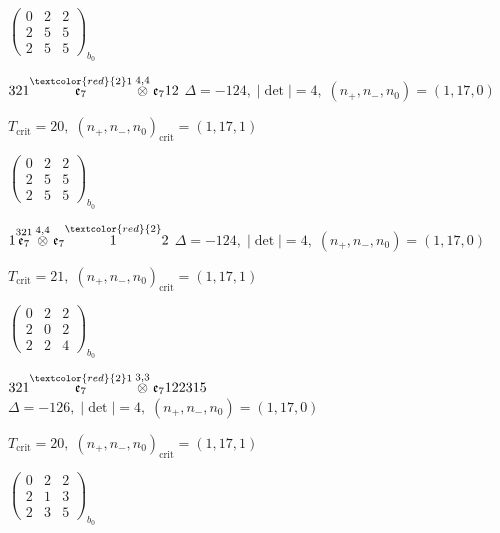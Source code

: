 \documentclass[10pt]{article}
\begin{document}
\hspace{2em}$\left(\begin{smallmatrix}0 & 2 & 2 \\ 2 & 5 & 5 \\ 2 & 5 & 5\end{smallmatrix}\right)_{\!b_0}$

\smallskip

$321\overset{\textcolor{red}{2}1}{\mathfrak{e}_7}\overset{4,4}{\otimes}\mathfrak{e}_712$ \quad $\Delta=-124,\; |\det|=4,\; (n_+,n_-,n_0)=(1,17,0)$

\hspace{1em}$T_{\text{crit}}=20,\; (n_+,n_-,n_0)_{\text{crit}}=(1,17,1)$

\hspace{2em}$\left(\begin{smallmatrix}0 & 2 & 2 \\ 2 & 5 & 5 \\ 2 & 5 & 5\end{smallmatrix}\right)_{\!b_0}$

$1\overset{321}{\mathfrak{e}_7}\overset{4,4}{\otimes}\mathfrak{e}_7\overset{\textcolor{red}{2}}{1}2$ \quad $\Delta=-124,\; |\det|=4,\; (n_+,n_-,n_0)=(1,17,0)$

\hspace{1em}$T_{\text{crit}}=21,\; (n_+,n_-,n_0)_{\text{crit}}=(1,17,1)$

\hspace{2em}$\left(\begin{smallmatrix}0 & 2 & 2 \\ 2 & 0 & 2 \\ 2 & 2 & 4\end{smallmatrix}\right)_{\!b_0}$

\smallskip

$321\overset{\textcolor{red}{2}1}{\mathfrak{e}_7}\overset{3,3}{\otimes}\mathfrak{e}_7122315$ \quad $\Delta=-126,\; |\det|=4,\; (n_+,n_-,n_0)=(1,17,0)$

\hspace{1em}$T_{\text{crit}}=20,\; (n_+,n_-,n_0)_{\text{crit}}=(1,17,1)$

\hspace{2em}$\left(\begin{smallmatrix}0 & 2 & 2 \\ 2 & 1 & 3 \\ 2 & 3 & 5\end{smallmatrix}\right)_{\!b_0}$
\end{document}
